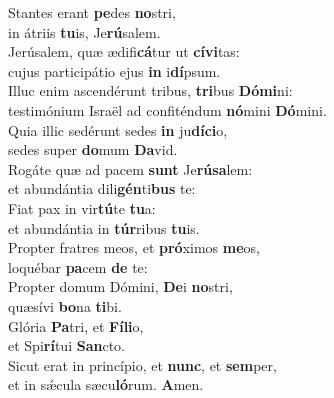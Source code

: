 \evenverse Stantes erant \textbf{pe}des \textbf{no}stri,~\*\\
\evenverse in átriis \textbf{tu}is, Je\textbf{rú}salem.\\
\oddverse Jerúsalem, quæ ædifi\textbf{cá}tur ut \textbf{cí}\textbf{vi}tas:~\*\\
\oddverse cujus participátio ejus \textbf{in} i\textbf{dí}psum.\\
\evenverse Illuc enim ascendérunt tribus, \textbf{tri}bus \textbf{Dó}\textbf{mi}ni:~\*\\
\evenverse testimónium Israël ad confiténdum \textbf{nó}mini \textbf{Dó}mini.\\
\oddverse Quia illic sedérunt sedes \textbf{in} ju\textbf{dí}\textbf{ci}o,~\*\\
\oddverse sedes super \textbf{do}mum \textbf{Da}vid.\\
\evenverse Rogáte quæ ad pacem \textbf{sunt} Je\textbf{rú}\textbf{sa}lem:~\*\\
\evenverse et abundántia dili\textbf{gén}ti\textbf{bus} te:\\
\oddverse Fiat pax in vir\textbf{tú}te \textbf{tu}a:~\*\\
\oddverse et abundántia in \textbf{túr}ribus \textbf{tu}is.\\
\evenverse Propter fratres meos, et \textbf{pró}ximos \textbf{me}os,~\*\\
\evenverse loquébar \textbf{pa}cem \textbf{de} te:\\
\oddverse Propter domum Dómini, \textbf{De}i \textbf{no}stri,~\*\\
\oddverse quæsívi \textbf{bo}na \textbf{ti}bi.\\
\evenverse Glória \textbf{Pa}tri, et \textbf{Fí}\textbf{li}o,~\*\\
\evenverse et Spi\textbf{rí}tui \textbf{San}cto.\\
\oddverse Sicut erat in princípio, et \textbf{nunc}, et \textbf{sem}per,~\*\\
\oddverse et in sǽcula sæcu\textbf{ló}rum. \textbf{A}men.\\
